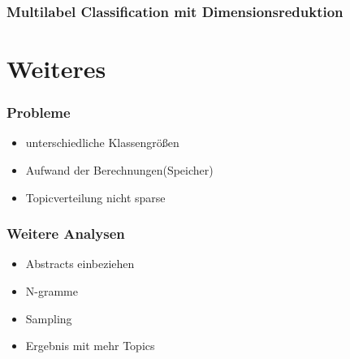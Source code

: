 \documentclass[12pt, xcolor=table]{beamer}
\begin{document}
\begin{frame}
    \frametitle{Multilabel Classification mit Dimensionsreduktion}
\end{frame}

\section{Weiteres} %
\label{sec:Weiteres}

\begin{frame}
    \frametitle{Probleme}
    \begin{itemize}
        \item unterschiedliche Klassengrößen
        \item Aufwand der Berechnungen(Speicher)
        \item Topicverteilung nicht sparse
    \end{itemize}
\end{frame}

\begin{frame}
    \frametitle{Weitere Analysen}
    \begin{itemize}
        \item Abstracts einbeziehen
        \item N-gramme
        \item Sampling
        \item Ergebnis mit mehr Topics
    \end{itemize}
\end{frame}
\end{document}
